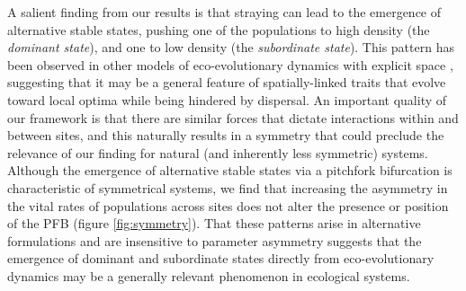 \documentclass{revtex4}
\begin{document}

A salient finding from our results is that straying can lead to the emergence of alternative stable states, pushing one of the populations to high density (the \emph{dominant state}), and one to low density (the \emph{subordinate state}).
This pattern has been observed in other models of eco-evolutionary dynamics with explicit space \citep{Ronce:2001dp}, suggesting that it may be a general feature of spatially-linked traits that evolve toward local optima while being hindered by dispersal.
An important quality of our framework is that there are similar forces that dictate interactions within and between sites, and this naturally results in a symmetry that could preclude the relevance of our finding for natural (and inherently less symmetric) systems.
Although the emergence of alternative stable states via a pitchfork bifurcation is characteristic of symmetrical systems, we find that increasing the asymmetry in the vital rates of populations across sites does not alter the presence or position of the PFB (figure \ref{fig:symmetry}).
That these patterns arise in alternative formulations and are insensitive to parameter asymmetry suggests that the emergence of dominant and subordinate states directly from eco-evolutionary dynamics may be a generally relevant phenomenon in ecological systems. %
\end{document}
